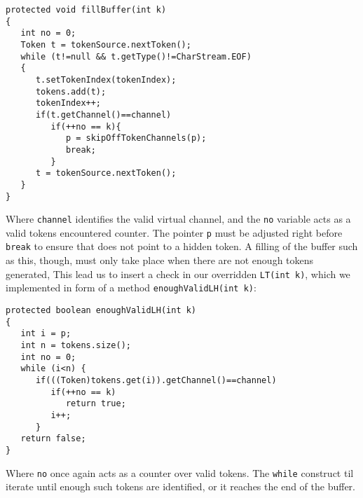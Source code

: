 \begin{verbatim}
protected void fillBuffer(int k) 
{
   int no = 0;
   Token t = tokenSource.nextToken();
   while (t!=null && t.getType()!=CharStream.EOF) 
   {
      t.setTokenIndex(tokenIndex);
      tokens.add(t);
      tokenIndex++;
      if(t.getChannel()==channel)
         if(++no == k){
            p = skipOffTokenChannels(p);
            break;
         }
      t = tokenSource.nextToken();
   }
}
\end{verbatim}
Where \verb!channel! identifies the valid virtual channel, and the \verb!no! variable acts as a valid tokens encountered counter. The pointer \verb!p! must be adjusted right before \verb!break! to ensure that does not point to a hidden token. A filling of the buffer such as this, though, must only take place when there are not enough tokens generated, This lead us to insert a check in our overridden \verb!LT(int k)!, which we implemented in form of a method \verb!enoughValidLH(int k)!:
\begin{verbatim}
protected boolean enoughValidLH(int k)
{
   int i = p;
   int n = tokens.size();
   int no = 0;
   while (i<n) {
      if(((Token)tokens.get(i)).getChannel()==channel)
         if(++no == k)
            return true;
         i++;
      }
   return false;
}
\end{verbatim}
Where \verb!no! once again acts as a counter over valid tokens. The \verb!while! construct til iterate until enough such tokens are identified, or it reaches the end of the buffer.

